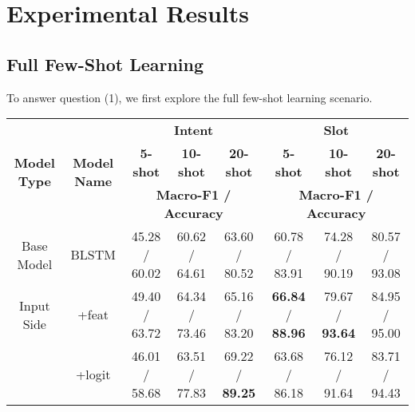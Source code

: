 \section{Experimental Results}
\label{sec:experiments}

\subsection{Full Few-Shot Learning}
To answer question (1), we first explore the full few-shot learning scenario.

\begin{table*}
\setlength{\tabcolsep}{0.23em}
\centering
\small{
\begin{tabular}{|c|c|c|c|c|c|c|c|}

\hline
\multirow{3}{*}{\textbf{Model Type}} & \multirow{3}{*}{\textbf{Model Name}}  & \multicolumn{3}{|c|}{\textbf{Intent}} & \multicolumn{3}{|c|}{\textbf{Slot}} \\
\cline{3-8}
&  & \multicolumn{1}{|c|}{\textbf{5-shot}} & \multicolumn{1}{|c|}{\textbf{10-shot}} & \multicolumn{1}{|c|}{\textbf{20-shot}}
& \multicolumn{1}{|c|}{\textbf{5-shot}} & \multicolumn{1}{|c|}{\textbf{10-shot}} & \multicolumn{1}{|c|}{\textbf{20-shot}}  \\
\cline{3-8}
&  & \multicolumn{3}{|c|}{\textbf{Macro-F1 / Accuracy}} & \multicolumn{3}{|c|}{\textbf{Macro-F1 / Accuracy}} \\
\hline

\rowcolor{Gray}Base Model & BLSTM & 45.28 / 60.02 & 60.62 / 64.61 & 63.60 / 80.52
& 60.78 / 83.91 & 74.28  / 90.19 & 80.57 / 93.08  \\
\hline
Input Side & +feat & 49.40 / 63.72 & 64.34 / 73.46 & 65.16 / 83.20
& \textbf{66.84} / \textbf{88.96} & 79.67 / \textbf{93.64} & 84.95 / 95.00  \\
\hline

\rowcolor{Gray}  & +logit & 46.01 / 58.68 & 63.51 / 77.83 & 69.22 / \textbf{89.25}
& 63.68 / 86.18 & 76.12 / 91.64  & 83.71 / 94.43 \\
\cline{2-8}


\end{tabular}}
\end{table*}
